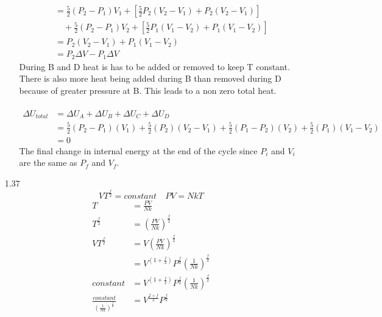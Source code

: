 \documentclass{article}
\begin{document}
\begin{enumerate}
\begin{enumerate}
\begin{align*}
                &= \frac{5}{2} (P_2 - P_1)V_1 + \left[ \frac{5}{2} P_2(V_2 - V_1) + P_2(V_2 - V_1) \right] \\
                & \quad + \frac{5}{2} (P_2 - P_1)V_2 + \left[ \frac{5}{2} P_1(V_1 - V_2) + P_1(V_1 - V_2) \right] \\
                &= P_2(V_2 - V_1) + P_1(V_1 - V_2) \\
                &= P_2 \Delta V - P_1 \Delta V
            \end{align*}
            During B and D heat is has to be added or removed to keep T constant. There is also more heat being added during B than removed during D because of greater pressure at B. This leads to a non zero total heat.
            \\ \\
            \begin{align*}
                \Delta U_{total} &= \Delta U_A + \Delta U_B + \Delta U_C + \Delta U_D \\
                &= \frac{5}{2} (P_2 - P_1)(V_1) + \frac{5}{2} (P_2)(V_2 - V_1) + \frac{5}{2} (P_1 - P_2)(V_2) + \frac{5}{2} (P_1)(V_1 - V_2) \\
                &= 0
            \end{align*}
            The final change in internal energy at the end of the cycle since \(P_i\) and \(V_i\) are the same as \(P_f\) and \(V_f\).
    \end{enumerate}
    \vspace{0.1in}
    \item [1.37]
        \begin{equation*}
            VT^{\frac{f}{2}} = constant \quad PV = NkT
        \end{equation*}
        \begin{align*}
            T &= \frac{PV}{Nk} \\
            T^{\frac{f}{2}} &= \left( \frac{PV}{Nk} \right)^{\frac{f}{2}} \\
            VT^{\frac{f}{2}} &= V \left( \frac{PV}{Nk} \right)^{\frac{f}{2}} \\
            &= V^{\left(1 + \frac{f}{2} \right)} P^{\frac{f}{2}} \left( \frac{1}{Nk} \right)^{\frac{f}{2}} \\
            constant &= V^{\left(1 + \frac{f}{2} \right)} P^{\frac{f}{2}} \left( \frac{1}{Nk} \right)^{\frac{f}{2}} \\
            \frac{constant}{\left( \frac{1}{Nk} \right)^{\frac{f}{2}}} &= V^{\frac{2 + f}{2}} P^{\frac{f}{2}}

\end{align*}
\end{enumerate}
\end{document}

